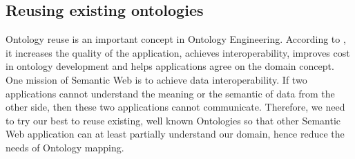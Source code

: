 \subsection{Reusing existing ontologies}
Ontology reuse is an important concept in Ontology Engineering. According to \cite{Simperl2009905}, it increases the quality of the application, achieves interoperability, improves cost in ontology development and helps applications agree on the domain concept. One mission of Semantic Web is to achieve data interoperability. If two applications cannot understand the meaning or the semantic of data from the other side, then these two applications cannot communicate. Therefore, we need to try our best to reuse existing, well known Ontologies so that other Semantic Web application can at least partially understand our domain, hence reduce the needs of Ontology mapping.


